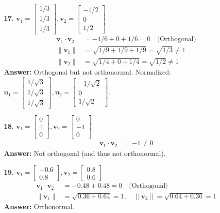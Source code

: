 \documentclass[11pt, letterpaper]{article}
\theoremstyle{definition}
\theoremstyle{remark}
\begin{document}
\textbf{17.} $\mathbf{v}_1 = \begin{bmatrix} 1/3 \\ 1/3 \\ 1/3 \end{bmatrix}, \mathbf{v}_2 = \begin{bmatrix} -1/2 \\ 0 \\ 1/2 \end{bmatrix}$
\begin{align*}
    \mathbf{v}_1 \cdot \mathbf{v}_2 &= -1/6 + 0 + 1/6 = 0 \quad \text{(Orthogonal)} \\
    \|\mathbf{v}_1\| &= \sqrt{1/9 + 1/9 + 1/9} = \sqrt{1/3} \neq 1 \\
    \|\mathbf{v}_2\| &= \sqrt{1/4 + 0 + 1/4} = \sqrt{1/2} \neq 1
\end{align*}
\textbf{Answer:} Orthogonal but not orthonormal. Normalized: $\mathbf{u}_1 = \begin{bmatrix} 1/\sqrt{3} \\ 1/\sqrt{3} \\ 1/\sqrt{3} \end{bmatrix}, \mathbf{u}_2 = \begin{bmatrix} -1/\sqrt{2} \\ 0 \\ 1/\sqrt{2} \end{bmatrix}$.

\textbf{18.} $\mathbf{v}_1 = \begin{bmatrix} 0 \\ 1 \\ 0 \end{bmatrix}, \mathbf{v}_2 = \begin{bmatrix} 0 \\ -1 \\ 0 \end{bmatrix}$
\begin{align*}
    \mathbf{v}_1 \cdot \mathbf{v}_2 &= -1 \neq 0
\end{align*}
\textbf{Answer:} Not orthogonal (and thus not orthonormal).

\textbf{19.} $\mathbf{v}_1 = \begin{bmatrix} -0.6 \\ 0.8 \end{bmatrix}, \mathbf{v}_2 = \begin{bmatrix} 0.8 \\ 0.6 \end{bmatrix}$
\begin{align*}
    \mathbf{v}_1 \cdot \mathbf{v}_2 &= -0.48 + 0.48 = 0 \quad \text{(Orthogonal)} \\
    \|\mathbf{v}_1\| &= \sqrt{0.36 + 0.64} = 1, \quad \|\mathbf{v}_2\| = \sqrt{0.64 + 0.36} = 1
\end{align*}
\textbf{Answer:} Orthonormal.
\end{document}
